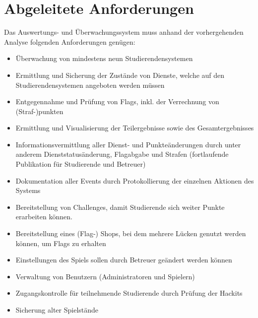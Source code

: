 \section{Abgeleitete Anforderungen}
\label{sec:Abgeleitete_Anforderungen}

Das Auswertungs- und Überwachungssystem muss anhand der vorhergehenden Analyse folgenden Anforderungen genügen:
\begin{itemize}
	\item Überwachung von mindestens neun Studierendensystemen
	\item Ermittlung und Sicherung der Zustände von Dienste, welche auf den Studierendensystemen angeboten werden müssen
	\item Entgegennahme und Prüfung von Flags, inkl. der Verrechnung von (Straf-)punkten
	\item Ermittlung und Visualisierung der Teilergebnisse sowie des Gesamtergebnisses
	\item Informationsvermittlung aller Dienst- und Punkteänderungen durch unter anderem Dienststatusänderung, Flagabgabe und Strafen (fortlaufende Publikation für Studierende und Betreuer)
	\item Dokumentation aller Events durch Protokollierung der einzelnen Aktionen des Systems
	\item Bereitstellung von Challenges, damit Studierende sich weiter Punkte erarbeiten können.
	\item Bereitstellung eines (Flag-) Shops, bei dem mehrere Lücken genutzt werden können, um Flags zu erhalten
	\item Einstellungen des Spiels sollen durch Betreuer geändert werden können
	\item Verwaltung von Benutzern (Administratoren und Spielern)
	\item Zugangskontrolle für teilnehmende Studierende durch Prüfung der Hackits
	\item Sicherung alter Spielstände
\end{itemize}